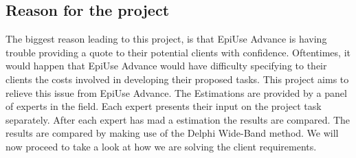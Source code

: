 \subsection{Reason for the project}
The biggest reason leading to this project, is that EpiUse Advance is having trouble providing a quote to their potential clients with confidence. Oftentimes, it would happen that EpiUse Advance would have difficulty specifying to their clients the costs involved in developing their proposed tasks. This project aims to relieve this issue from EpiUse Advance.
\newline
The Estimations are provided by a panel of experts in the field. Each expert presents their input on the project task separately. After each expert has mad a estimation the results are compared. The results are compared by making use of the Delphi Wide-Band method. We will now proceed to take a look at how we are solving the client requirements.
